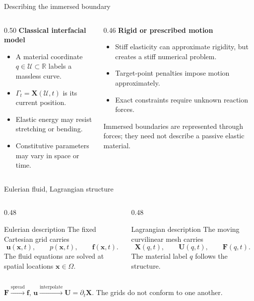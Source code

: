 \documentclass[aspectratio=169,11pt]{beamer}
\newcommand{\uvec}{\bm{u}}
\newcommand{\xvec}{\bm{x}}
\newcommand{\Xvec}{\bm{X}}
\newcommand{\Uvec}{\bm{U}}
\newcommand{\fvec}{\bm{f}}
\newcommand{\Fvec}{\bm{F}}
\begin{document}
\begin{frame}{Describing the immersed boundary}
\begin{columns}[T,onlytextwidth]
\begin{column}{0.50\textwidth}
\textbf{Classical interfacial model}
\begin{itemize}\itemsep6pt
  \item A material coordinate \(q\in\mathcal U\subset\mathbb R\) labels a massless curve.
  \item \(\Gamma_t=\Xvec(\mathcal U,t)\) is its current position.
  \item Elastic energy may resist stretching or bending.
  \item Constitutive parameters may vary in space or time.
\end{itemize}
\end{column}
\begin{column}{0.46\textwidth}
\textbf{Rigid or prescribed motion}
\begin{itemize}\itemsep6pt
  \item Stiff elasticity can approximate rigidity, but creates a stiff numerical problem.
  \item Target-point penalties impose motion approximately.
  \item Exact constraints require unknown reaction forces.
\end{itemize}
\begin{punchbox}
\small Immersed boundaries are represented through forces; they need not describe a passive elastic material.
\end{punchbox}
\end{column}
\end{columns}
\end{frame}

\begin{frame}{Eulerian fluid, Lagrangian structure}
\begin{columns}[T,onlytextwidth]
\begin{column}{0.48\textwidth}
\begin{block}{Eulerian description}
The fixed Cartesian grid carries
\[
  \uvec(\xvec,t),\qquad p(\xvec,t),\qquad \fvec(\xvec,t).
\]
The fluid equations are solved at spatial locations \(\xvec\in\Omega\).
\end{block}
\end{column}
\begin{column}{0.48\textwidth}
\begin{block}{Lagrangian description}
The moving curvilinear mesh carries
\[
  \Xvec(q,t),\qquad \Uvec(q,t),\qquad \Fvec(q,t).
\]
The material label \(q\) follows the structure.
\end{block}
\end{column}
\end{columns}
\begin{punchbox}
\centering
\(\Fvec\overset{\text{spread}}{\longrightarrow}\fvec\),
\qquad
\(\uvec\overset{\text{interpolate}}{\longrightarrow}\Uvec=\partial_t\Xvec\).
The grids do not conform to one another.
\end{punchbox}
\end{frame}
\end{document}
